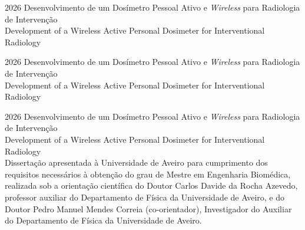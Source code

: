 \documentclass[11pt,twoside,a4paper]{report}
\def\ThesisYear{2026}
\begin{document}
\TitlePage
  \HEADER{\BAR\FIG{\begin{minipage}{50mm}
           \begin{flushright}
           \end{flushright}
          \end{minipage}}}
         {\ThesisYear}
        {Desenvolvimento de um Dosímetro Pessoal Ativo e \textsl{Wireless} para Radiologia de Intervenção\\[1\baselineskip]
        Development of a Wireless Active Personal Dosimeter for Interventional Radiology\\
        }
\EndTitlePage

\TitlePage
         {\ThesisYear}
        {Desenvolvimento de um Dosímetro Pessoal Ativo e \textsl{Wireless} para Radiologia de Intervenção\\[1\baselineskip]
        Development of a Wireless Active Personal Dosimeter for Interventional Radiology\\
        }
\EndTitlePage

\TitlePage
\INNERHEADER{}
         {\ThesisYear}
        {Desenvolvimento de um Dosímetro Pessoal Ativo e \textsl{Wireless} para Radiologia de Intervenção\\[1\baselineskip]
        Development of a Wireless Active Personal Dosimeter for Interventional Radiology\\ 
        }
  \vspace*{15mm}
  \TEXT{}
      {Dissertação apresentada à Universidade de Aveiro para cumprimento dos requisitos necessários à obtenção do grau de Mestre em Engenharia Biomédica, realizada sob a orientação científica do Doutor Carlos Davide da Rocha Azevedo, professor auxiliar do Departamento de Física da Universidade de Aveiro, e do Doutor Pedro Manuel Mendes Correia (co-orientador), Investigador do Auxiliar do Departamento de Física da Universidade de Aveiro.}
\end{document}
